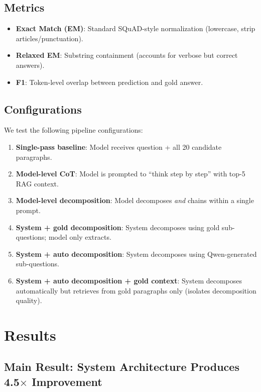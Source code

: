 \documentclass[11pt]{article}
\begin{document}
\subsection{Metrics}

\begin{itemize}[nosep]
    \item \textbf{Exact Match (EM)}: Standard SQuAD-style normalization (lowercase, strip articles/punctuation).
    \item \textbf{Relaxed EM}: Substring containment (accounts for verbose but correct answers).
    \item \textbf{F1}: Token-level overlap between prediction and gold answer.
\end{itemize}

\subsection{Configurations}

We test the following pipeline configurations:

\begin{enumerate}[nosep]
    \item \textbf{Single-pass baseline}: Model receives question + all 20 candidate paragraphs.
    \item \textbf{Model-level CoT}: Model is prompted to ``think step by step'' with top-5 RAG context.
    \item \textbf{Model-level decomposition}: Model decomposes \emph{and} chains within a single prompt.
    \item \textbf{System + gold decomposition}: System decomposes using gold sub-questions; model only extracts.
    \item \textbf{System + auto decomposition}: System decomposes using Qwen-generated sub-questions.
    \item \textbf{System + auto decomposition + gold context}: System decomposes automatically but retrieves from gold paragraphs only (isolates decomposition quality).
\end{enumerate}

\section{Results}
\label{sec:results}

\subsection{Main Result: System Architecture Produces 4.5$\times$ Improvement}
\end{document}
